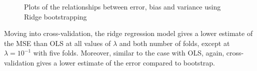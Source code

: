 \documentclass{article}
\begin{document}
\begin{figure}[h]\centering
{}\hfill
{} \par
{}\hfill
{}\par
\caption{Plots of the relationships between error, bias and variance using Ridge bootstrapping}
\label{Ridgebootstrap}
\end{figure}
Moving into cross-validation, the ridge regression model gives a lower estimate of the MSE than OLS at all values of $\lambda$ and both number of folds, except at $\lambda = 10^{-1}$ with five folds. Moreover, similar to the case with OLS, again, cross-validation gives a lower estimate of the error compared to bootstrap.
\end{document}
